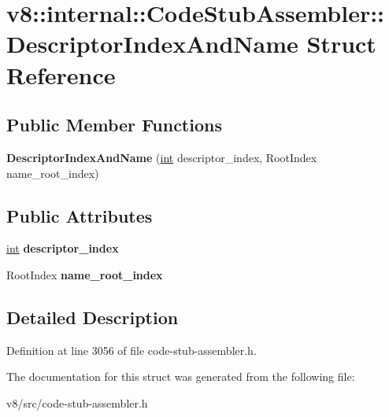 \hypertarget{structv8_1_1internal_1_1CodeStubAssembler_1_1DescriptorIndexAndName}{}\section{v8\+:\+:internal\+:\+:Code\+Stub\+Assembler\+:\+:Descriptor\+Index\+And\+Name Struct Reference}
\label{structv8_1_1internal_1_1CodeStubAssembler_1_1DescriptorIndexAndName}
\subsection*{Public Member Functions}
\begin{DoxyCompactItemize}
\item 
\mbox{\label{structv8_1_1internal_1_1CodeStubAssembler_1_1DescriptorIndexAndName_a16f7059b6ce5873bf783b24a2c95a8aa}} 
{\bfseries Descriptor\+Index\+And\+Name} (\mbox{\hyperlink{classint}{int}} descriptor\+\_\+index, Root\+Index name\+\_\+root\+\_\+index)
\end{DoxyCompactItemize}
\subsection*{Public Attributes}
\begin{DoxyCompactItemize}
\item 
\mbox{\label{structv8_1_1internal_1_1CodeStubAssembler_1_1DescriptorIndexAndName_a95425473e41012a56e118881692a5615}} 
\mbox{\hyperlink{classint}{int}} {\bfseries descriptor\+\_\+index}
\item 
\mbox{\label{structv8_1_1internal_1_1CodeStubAssembler_1_1DescriptorIndexAndName_a976fbfb8ce3f84453c18435c0d460af2}} 
Root\+Index {\bfseries name\+\_\+root\+\_\+index}
\end{DoxyCompactItemize}


\subsection{Detailed Description}


Definition at line 3056 of file code-\/stub-\/assembler.\+h.



The documentation for this struct was generated from the following file\+:\begin{DoxyCompactItemize}
\item 
v8/src/code-\/stub-\/assembler.\+h\end{DoxyCompactItemize}
